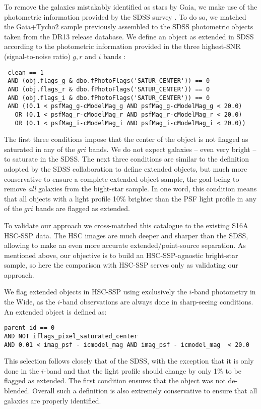\documentclass[11pt,a4paper,oneside,final]{scrartcl}
\begin{document}
To remove the galaxies mistakably identified as stars by Gaia, we make use of the photometric information provided by the SDSS survey \citep{york:2000aa,SDSS-Collaboration:2016aa}. To do so, we matched the Gaia+Tycho2 sample previously assembled to the SDSS photometric objects taken from the DR13 release database. We define an object as extended in SDSS according to the photometric information provided in the three highest-SNR (signal-to-noise ratio) $g,r$ and $i$ bands :
%
\begin{verbatim}
 clean == 1
 AND (obj.flags_g & dbo.fPhotoFlags('SATUR_CENTER')) == 0
 AND (obj.flags_r & dbo.fPhotoFlags('SATUR_CENTER')) == 0
 AND (obj.flags_i & dbo.fPhotoFlags('SATUR_CENTER')) == 0
 AND ((0.1 < psfMag_g-cModelMag_g AND psfMag_g-cModelMag_g < 20.0)
   OR (0.1 < psfMag_r-cModelMag_r AND psfMag_r-cModelMag_r < 20.0)
   OR (0.1 < psfMag_i-cModelMag_i AND psfMag_i-cModelMag_i < 20.0))
\end{verbatim}


The first three conditions impose that the center of the object is not flagged as saturated in any of the $gri$ bands. We do not expect galaxies -- even very bright -- to saturate in the SDSS. The next three conditions are similar to the definition adopted by the SDSS collaboration to define extended objects, but much more conservative to ensure a complete extended-object sample, the goal being to remove \emph{all} galaxies from the bight-star sample. In one word, this condition means that all objects with a light profile 10\% brighter than the PSF light profile in any of the $gri$ bands are flagged as extended.

To validate our approach we cross-matched this catalogue to the existing S16A HSC-SSP data. The HSC images are much deeper and sharper than the SDSS, allowing to make an even more accurate extended/point-source separation. As mentioned above, our objective is to build an HSC-SSP-agnostic bright-star sample, so here the comparison with HSC-SSP serves only as validating our approach. 

We flag extended objects in HSC-SSP using exclusively the $i$-band photometry in the Wide, as the $i$-band observations are always done in sharp-seeing conditions. An extended object is defined as:
%
\begin{verbatim}
parent_id == 0
AND NOT iflags_pixel_saturated_center 
AND 0.01 < imag_psf - icmodel_mag AND imag_psf - icmodel_mag  < 20.0
\end{verbatim}

This selection follows closely that of the SDSS, with the exception that it is only done in the $i$-band and that the light profile should change by only 1\% to be flagged as extended. The first condition ensures that the object was not de-blended. Overall such a definition is also extremely conservative to ensure that all galaxies are properly identified.
\end{document}
